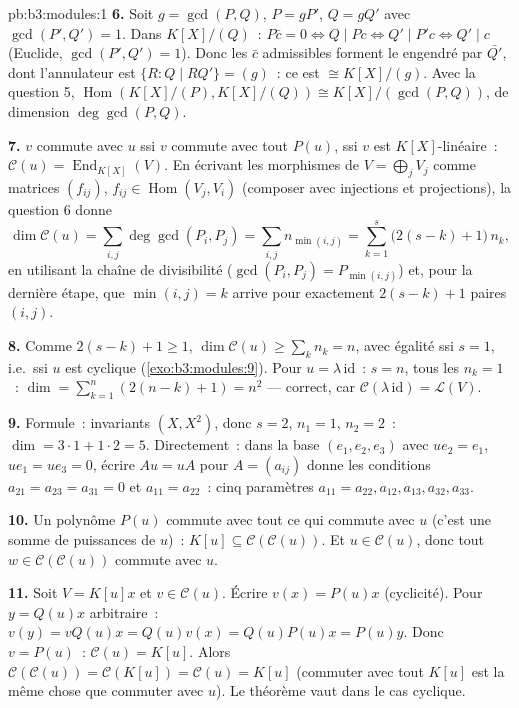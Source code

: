 \begin{solution}{pb:b3:modules:1}
\textbf{6.} Soit $g = \gcd(P, Q)$, $P = gP'$, $Q = gQ'$ avec
$\gcd(P', Q') = 1$. Dans $K[X]/(Q)$~: $P\bar c = 0 \iff Q \mid
Pc \iff Q' \mid P'c \iff Q' \mid c$ (Euclide, $\gcd(P', Q') =
1$). Donc les $\bar c$ admissibles forment le 
engendré par $\bar{Q'}$, dont l'annulateur est $\{R : Q \mid
RQ'\} = (g)$~: ce  est $\cong K[X]/(g)$. Avec la
question 5, $\operatorname{Hom}(K[X]/(P), K[X]/(Q)) \cong
K[X]/(\gcd(P,Q))$, de dimension $\deg\gcd(P,Q)$.

\textbf{7.} $v$ commute avec $u$ ssi $v$ commute avec tout
$P(u)$, ssi $v$ est $K[X]$-linéaire~: $\mathcal C(u) =
\operatorname{End}_{K[X]}(V)$. En écrivant les morphismes de $V
= \bigoplus_j V_j$ comme matrices $(f_{ij})$, $f_{ij} \in
\operatorname{Hom}(V_j, V_i)$ (composer avec injections et
projections), la question 6 donne
\[
\dim \mathcal C(u) = \sum_{i,j} \deg\gcd(P_i, P_j)
= \sum_{i,j} n_{\min(i,j)}
= \sum_{k=1}^{s} \bigl(2(s - k) + 1\bigr)\,n_k ,
\]
en utilisant la chaîne de divisibilité ($\gcd(P_i, P_j) =
P_{\min(i,j)}$) et, pour la dernière étape, que $\min(i,j) = k$
arrive pour exactement $2(s - k) + 1$ paires $(i, j)$.

\textbf{8.} Comme $2(s-k)+1 \geq 1$, $\dim\mathcal C(u) \geq
\sum_k n_k = n$, avec égalité ssi $s = 1$, i.e.\ ssi $u$ est
cyclique (\cref{exo:b3:modules:9}). Pour $u =
\lambda\,\mathrm{id}$~: $s = n$, tous les $n_k = 1$~: $\dim =
\sum_{k=1}^n (2(n-k)+1) = n^2$ --- correct, car $\mathcal
C(\lambda\,\mathrm{id}) = \mathcal L(V)$.

\textbf{9.} Formule~: invariants $(X, X^2)$, donc $s = 2$, $n_1
= 1$, $n_2 = 2$~: $\dim = 3\cdot1 + 1\cdot2 = 5$. Directement~:
dans la base $(e_1, e_2, e_3)$ avec $u e_2 = e_1$, $ue_1 = ue_3
= 0$, écrire $Au = uA$ pour $A = (a_{ij})$ donne les conditions
$a_{21} = a_{23} = a_{31} = 0$ et $a_{11} = a_{22}$~: cinq
paramètres  $a_{11}{=}a_{22}, a_{12}, a_{13}, a_{32},
a_{33}$.

\textbf{10.} Un polynôme $P(u)$ commute avec tout ce qui commute
avec $u$ (c'est une somme de puissances de $u$)~: $K[u]
\subseteq \mathcal C(\mathcal C(u))$. Et $u \in \mathcal C(u)$,
donc tout $w \in \mathcal C(\mathcal C(u))$ commute avec $u$.

\textbf{11.} Soit $V = K[u]x$ et $v \in \mathcal C(u)$. Écrire
$v(x) = P(u)x$ (cyclicité). Pour $y = Q(u)x$ arbitraire~: $v(y)
= vQ(u)x = Q(u)v(x) = Q(u)P(u)x = P(u)y$. Donc $v = P(u)$~:
$\mathcal C(u) = K[u]$. Alors $\mathcal C(\mathcal C(u)) =
\mathcal C(K[u]) = \mathcal C(u) = K[u]$ (commuter avec tout
$K[u]$ est la même chose que commuter avec $u$). Le théorème
vaut dans le cas cyclique.


\end{solution}
